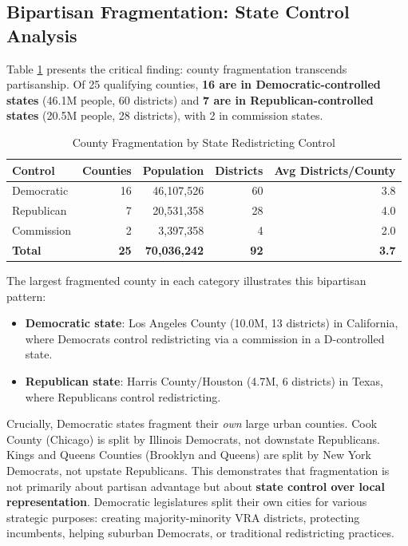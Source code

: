 \subsection{Bipartisan Fragmentation: State Control Analysis}

Table \ref{tab:bipartisan} presents the critical finding: county fragmentation transcends partisanship. Of 25 qualifying counties, \textbf{16 are in Democratic-controlled states} (46.1M people, 60 districts) and \textbf{7 are in Republican-controlled states} (20.5M people, 28 districts), with 2 in commission states.

\begin{table}[h]
\centering
\caption{County Fragmentation by State Redistricting Control}
\label{tab:bipartisan}
\begin{tabular}{lrrrr}
\toprule
Control & Counties & Population & Districts & Avg Districts/County \\
\midrule
Democratic & 16 & 46,107,526 & 60 & 3.8 \\
Republican & 7 & 20,531,358 & 28 & 4.0 \\
Commission & 2 & 3,397,358 & 4 & 2.0 \\
\midrule
\textbf{Total} & \textbf{25} & \textbf{70,036,242} & \textbf{92} & \textbf{3.7} \\
\bottomrule
\end{tabular}
\end{table}

The largest fragmented county in each category illustrates this bipartisan pattern:
\begin{itemize}
\item \textbf{Democratic state}: Los Angeles County (10.0M, 13 districts) in California, where Democrats control redistricting via a commission in a D-controlled state.
\item \textbf{Republican state}: Harris County/Houston (4.7M, 6 districts) in Texas, where Republicans control redistricting.
\end{itemize}

Crucially, Democratic states fragment their \emph{own} large urban counties. Cook County (Chicago) is split by Illinois Democrats, not downstate Republicans. Kings and Queens Counties (Brooklyn and Queens) are split by New York Democrats, not upstate Republicans. This demonstrates that fragmentation is not primarily about partisan advantage but about \textbf{state control over local representation}. Democratic legislatures split their own cities for various strategic purposes: creating majority-minority VRA districts, protecting incumbents, helping suburban Democrats, or traditional redistricting practices.

